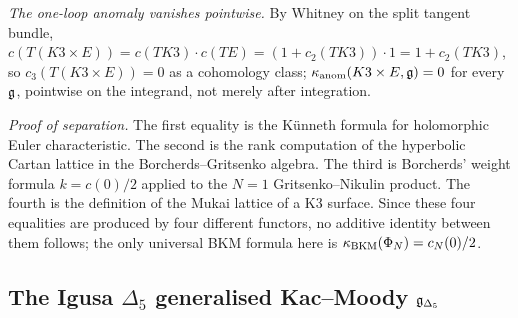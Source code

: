 \begin{theorem}
\emph{The one-loop anomaly vanishes pointwise.} By Whitney on the
split tangent bundle, $c(T(K3 \times E)) = c(TK3) \cdot c(TE) =
(1 + c_2(TK3)) \cdot 1 = 1 + c_2(TK3)$, so $c_3(T(K3 \times E)) = 0$
as a cohomology class; $\kappa_{\mathrm{anom}}(K3 \times E, \mathfrak{g}) = 0$ for every $\mathfrak{g}$,
pointwise on the integrand, not merely after integration.

\emph{Proof of separation.} The first equality is the K\"unneth formula
for holomorphic Euler characteristic.  The second is the rank computation
of the hyperbolic Cartan lattice in the Borcherds--Gritsenko algebra.
The third is Borcherds' weight formula $k=c(0)/2$ applied to the
$N=1$ Gritsenko--Nikulin product.  The fourth is the definition of the
Mukai lattice of a K3 surface.  Since these four equalities are produced
by four different functors, no additive identity between them follows;
the only universal BKM formula here is $\kappa_{\mathrm{BKM}}(\Phi_N)=c_N(0)/2$.
\end{theorem}

\subsection{The Igusa $\Delta_5$ generalised Kac--Moody
$\mathfrak{g}_{\Delta_5}$}
\label{wn:subsec:spine-delta5}


